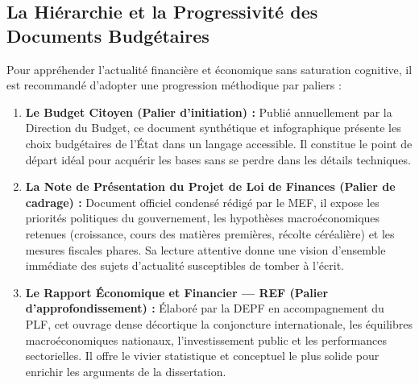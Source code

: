 \subsection{La Hiérarchie et la Progressivité des Documents Budgétaires}
Pour appréhender l'actualité financière et économique sans saturation cognitive, il est recommandé d'adopter une progression méthodique par paliers :
\begin{enumerate}
    \item \textbf{Le Budget Citoyen (Palier d'initiation) :} Publié annuellement par la Direction du Budget, ce document synthétique et infographique présente les choix budgétaires de l'État dans un langage accessible. Il constitue le point de départ idéal pour acquérir les bases sans se perdre dans les détails techniques.
    \item \textbf{La Note de Présentation du Projet de Loi de Finances (Palier de cadrage) :} Document officiel condensé rédigé par le MEF, il expose les priorités politiques du gouvernement, les hypothèses macroéconomiques retenues (croissance, cours des matières premières, récolte céréalière) et les mesures fiscales phares. Sa lecture attentive donne une vision d'ensemble immédiate des sujets d'actualité susceptibles de tomber à l'écrit.
    \item \textbf{Le Rapport Économique et Financier --- REF (Palier d'approfondissement) :} Élaboré par la DEPF en accompagnement du PLF, cet ouvrage dense décortique la conjoncture internationale, les équilibres macroéconomiques nationaux, l'investissement public et les performances sectorielles. Il offre le vivier statistique et conceptuel le plus solide pour enrichir les arguments de la dissertation.
\end{enumerate}

